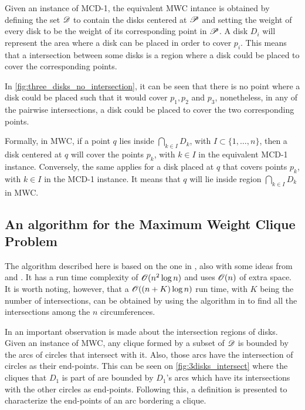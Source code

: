 Given an instance of MCD-1, the equivalent MWC intance is obtained by defining the set $\mathscr{D}$ to contain the disks centered at $\mathscr{P}$ and setting the weight of every disk to be the weight of its corresponding point in $\mathscr{P}$. A disk $D_i$ will represent the area where a disk can be placed in order to cover $p_i$. This means that a intersection between some disks is a region where a disk could be placed to cover the corresponding points.

In \autoref{fig:three_disks_no_intersection}, it can be seen that there is no point where a disk could be placed such that it would cover $p_1, p_2$ and $p_3$, nonetheless, in any of the pairwise intersections, a disk could be placed to cover the two corresponding points.

Formally, in MWC, if a point $q$ lies inside $\bigcap_{k \in I} D_k$, with $I \subset \{1,\dots,n\}$, then a disk centered at $q$ will cover the points $p_k$, with $k\in I$ in the equivalent MCD-1 instance. Conversely, the same applies for a disk placed at $q$ that covers points $p_k$, with $k \in I$ in the MCD-1 instance. It means that $q$ will lie inside region $\bigcap_{k \in I} D_k$ in MWC.

\subsection{An algorithm for the Maximum Weight Clique Problem}

The algorithm described here is based on the one in , also with some ideas from  and . It has a run time complexity of $\mathscr{O}(n^2\log{n})$ and uses $\mathscr{O}(n)$ of extra space. It is worth noting, however, that a $\mathscr{O}((n+K)\log{n})$ run time, with $K$ being the number of intersections, can be obtained by using the algorithm in  to find all the intersections among the $n$ circumferences.

In  an important observation is made about the intersection regions of disks. Given an instance of MWC, any clique formed by a subset of $\mathscr{D}$ is bounded by the arcs of circles that intersect with it. Also, those arcs have the intersection of circles as their end-points. This can be seen on \autoref{fig:3disks_intersect} where the cliques that $D_1$ is part of are bounded by $D_1$'s arcs which have its intersections with the other circles as end-points. Following this, a definition is presented to characterize the end-points of an arc bordering a clique.

